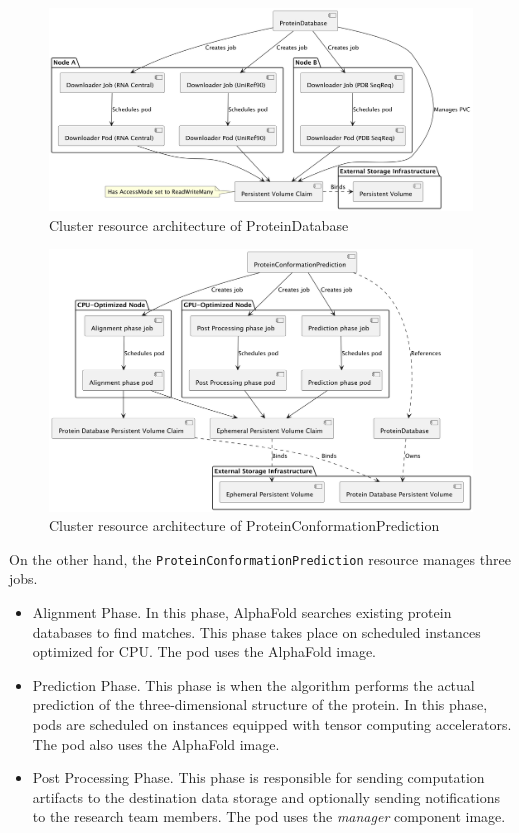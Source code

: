 \begin{figure}[htbp]
    \centering
    \includegraphics[width=\textwidth]{images/proteindatabase}
    \caption{Cluster resource architecture of ProteinDatabase}
    \label{fig:proteindatabase}
\end{figure}

\begin{figure}[htbp]
    \centering
    \includegraphics[width=\textwidth]{images/proteinconformationprediction}
    \caption{Cluster resource architecture of ProteinConformationPrediction}
    \label{fig:proteinconformationprediction}
\end{figure}

On the other hand, the \texttt{ProteinConformationPrediction} resource manages three jobs.
\begin{itemize}
    \item Alignment Phase.
    In this phase, AlphaFold searches existing protein databases to find matches.
    This phase takes place on scheduled instances optimized for CPU. The pod uses the AlphaFold image.
    \item Prediction Phase.
    This phase is when the algorithm performs the actual prediction of the three-dimensional structure of the protein.
    In this phase, pods are scheduled on instances equipped with tensor computing accelerators.
    The pod also uses the AlphaFold image.
    \item Post Processing Phase.
    This phase is responsible for sending computation artifacts to the destination data storage and optionally sending notifications to the research team members.
    The pod uses the \textit{manager} component image.
\end{itemize}

